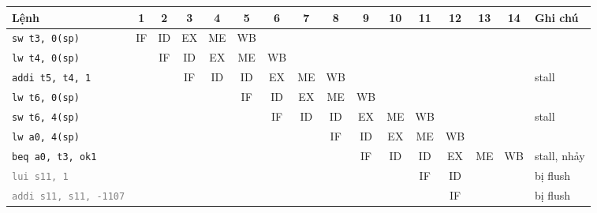 \begin{tabular}{@{}lccccccccccccccl@{}}
\toprule
Lệnh & 1 & 2 & 3 & 4 & 5 & 6 & 7 & 8 & 9 & 10 & 11 & 12 & 13 & 14 & Ghi chú \\
\midrule
\texttt{sw t3, 0(sp)} & \cellcolor{cIF}\tiny IF & \cellcolor{cID}\tiny ID & \cellcolor{cEX}\tiny EX & \cellcolor{cME}\tiny ME & \cellcolor{cWB}\tiny WB &  &  &  &  &  &  &  &  &  &  \\
\texttt{lw t4, 0(sp)} &  & \cellcolor{cIF}\tiny IF & \cellcolor{cID}\tiny ID & \cellcolor{cEX}\tiny EX & \cellcolor{cME}\tiny ME & \cellcolor{cWB}\tiny WB &  &  &  &  &  &  &  &  &  \\
\texttt{addi t5, t4, 1} &  &  & \cellcolor{cIF}\tiny IF & \cellcolor{cID}\tiny ID & \cellcolor{cST}\tiny ID & \cellcolor{cEX}\tiny EX & \cellcolor{cME}\tiny ME & \cellcolor{cWB}\tiny WB &  &  &  &  &  &  & stall \\
\texttt{lw t6, 0(sp)} &  &  &  &  & \cellcolor{cIF}\tiny IF & \cellcolor{cID}\tiny ID & \cellcolor{cEX}\tiny EX & \cellcolor{cME}\tiny ME & \cellcolor{cWB}\tiny WB &  &  &  &  &  &  \\
\texttt{sw t6, 4(sp)} &  &  &  &  &  & \cellcolor{cIF}\tiny IF & \cellcolor{cID}\tiny ID & \cellcolor{cST}\tiny ID & \cellcolor{cEX}\tiny EX & \cellcolor{cME}\tiny ME & \cellcolor{cWB}\tiny WB &  &  &  & stall \\
\texttt{lw a0, 4(sp)} &  &  &  &  &  &  &  & \cellcolor{cIF}\tiny IF & \cellcolor{cID}\tiny ID & \cellcolor{cEX}\tiny EX & \cellcolor{cME}\tiny ME & \cellcolor{cWB}\tiny WB &  &  &  \\
\texttt{beq a0, t3, ok1} &  &  &  &  &  &  &  &  & \cellcolor{cIF}\tiny IF & \cellcolor{cID}\tiny ID & \cellcolor{cST}\tiny ID & \cellcolor{cEX}\tiny EX & \cellcolor{cME}\tiny ME & \cellcolor{cWB}\tiny WB & stall, nhảy \\
\textcolor{gray}{\texttt{lui s11, 1}} &  &  &  &  &  &  &  &  &  &  & \cellcolor{cIF}\tiny IF & \cellcolor{cID}\tiny ID &  &  & bị flush \\
\textcolor{gray}{\texttt{addi s11, s11, -1107}} &  &  &  &  &  &  &  &  &  &  &  & \cellcolor{cIF}\tiny IF &  &  & bị flush \\
\bottomrule
\end{tabular}
